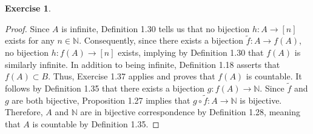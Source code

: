 \documentclass[titlepage]{article}
\newcounter{script}
\theoremstyle{definition}
\newtheorem{exercise}{Exercise}[script]
\newcommand{\N}{\mathbb{N}}
\begin{document}
\begin{exercise}
\begin{proof}
        Since $A$ is infinite, Definition 1.30 tells us that no bijection $h:A\to[n]$ exists for any $n\in\N$. Consequently, since there exists a bijection $\tilde{f}:A\to f(A)$, no bijection $h:f(A)\to[n]$ exists, implying by Definition 1.30 that $f(A)$ is similarly infinite. In addition to being infinite, Definition 1.18 asserts that $f(A)\subset B$. Thus, Exercise 1.37 applies and proves that $f(A)$ is countable. It follows by Definition 1.35 that there exists a bijection $g:f(A)\to\N$. Since $\tilde{f}$ and $g$ are both bijective, Proposition 1.27 implies that $g\circ\tilde{f}:A\to\N$ is bijective. Therefore, $A$ and $\N$ are in bijective correspondence by Definition 1.28, meaning that $A$ is countable by Definition 1.35.
    \end{proof}
\end{exercise}
\end{document}
